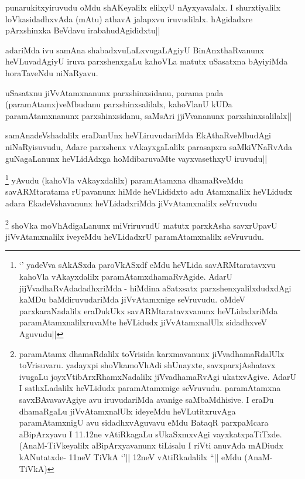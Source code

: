 \begin{artha}
punarukitxyiruvudu oMdu shAKeyalilx elilxyU nAyxyavalalx. I shurxtiyalilx loVkasidadhxvAda (mAtu) athavA jalapxvu iruvudilalx. hAgidadxre pArxshinxka BeVdavu irabahudAgididxtu||
\end{artha}


\begin{artha}
adariMda ivu samAna shabadxvuLaLxvugaLAgiyU BinAnxthaRvanunx heVLuvadAgiyU iruva parxshenxgaLu kahoVLa matutx uSasatxna bAyiyiMda horaTaveNdu niNaRyavu.
\end{artha}%


\begin{artha}
uSasatxnu jiVvAtamxnanunx parxshinxsidanu, parama pada (paramAtamx)veMbudanu parxshinxsalilalx, kahoVlanU kUDa paramAtamxnanunx parxshinxsidanu, saMsAri jjiVvananunx parxshinxsalilalx||
\end{artha}


\begin{artha}
samAnadeVshadalilx eraDanUnx heVLiruvudariMda EkAthaRveMbudAgi niNaRyisuvudu, Adare parxshenx vAkayxgaLalilx parasapxra saMkiVNaRvAda guNagaLanunx heVLidAdxga hoMdibaruvaMte vayxvasethxyU iruvudu||
\end{artha}

\begin{artha}%
\footnote[1]{`\stext ' yadeVva sAkASxda paroVkASxdf \stext eMdu heVLida savARMtaratavxvu kahoVla vAkayxdalilx paramAtamxdhamaRvAgide. AdarU jijVvadhaRvAdadadhxriMda - hiMdina aSatxsatx parxshenxyalilxdudxdAgi kaMDu baMdiruvudariMda jiVvAtamxnige seVruvudu. oMdeV parxkaraNadalilx eraDukUkx savARMtaratavxvanunx heVLidadxriMda paramAtamxnalilxruvaMte heVLidudx jiVvAtamxnalUlx sidadhxveV Aguvudu||} yAvudu (kahoVla vAkayxdalilx) paramAtamxna dhamaRveMdu savARMtaratama rUpavanunx hiMde heVLididxto adu Atamxnalilx heVLidudx adara EkadeVshavanunx heVLidadxriMda jiVvAtamxnalilx seVruvudu
\end{artha}

\begin{artha}
\footnote[2]{paramAtamx dhamaRdalilx toVrisida karxmavanunx jiVvadhamaRdalUlx toVrisuvaru. yadayxpi shoVkamoVhAdi shUnayxte, savxparxjAshatavx ivugaLu joyxVtibArxRhamxNadalilx jiVvadhamaRvAgi ukatxvAgive. AdarU I sathxLadalilx heVLidudx paramAtamxnige seVruvudu. paramAtamxna savxBAvavavAgiye avu iruvudariMda avanige saMbaMdhisive. I eraDu dhamaRgaLu jiVvAtamxnalUlx ideyeMdu heVLutitxruvAga paramAtamxnigU avu sidadhxvAguvavu eMdu BataqR parxpaMcara aBipArxyavu I 11.12ne vAtiRkagaLu sUkaSxmxvAgi vayxkatxpaTiTxde. (AnaM-TiVkeyalilx aBipArxyavanunx tiLisalu I riVti anuvAda mADiudx kANutatxde- 11neV TiVkA `\stext '|| 12neV vAtiRkadalilx ``\stext || eMdu (AnaM-TiVkA)} shoVka moVhAdigaLanunx miVriruvudU matutx parxkAsha savxrUpavU jiVvAtamxnalilx iveyeMdu heVLidadxrU paramAtamxnalilx seVruvudu.
\end{artha}


